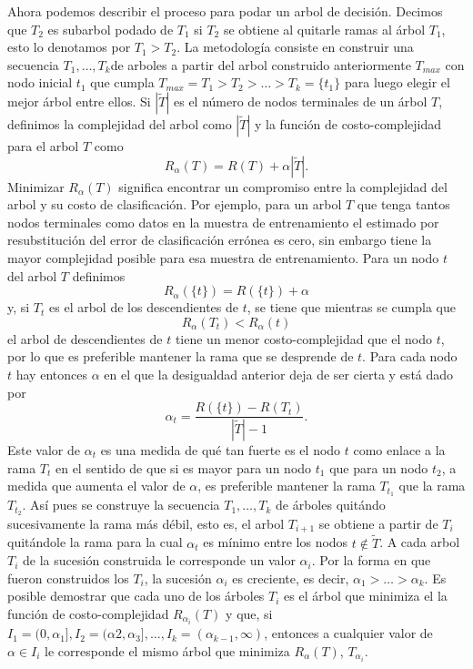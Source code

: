 \documentclass[letterpaper,12pt]{book}
\begin{document}
Ahora podemos describir el proceso para podar un arbol de decisión. Decimos que  $T_2$ es subarbol podado de $T_1$ si $T_2$ se obtiene al quitarle ramas al árbol $T_1$, esto lo denotamos por $T_1>T_2$. La metodología consiste en construir una secuencia $T_1,\dots,T_k$de arboles a partir del arbol construido anteriormente $T_{max}$ con nodo inicial $t_1$ que cumpla $T_{max} = T_1>T_2>\dots>T_{k}=\{t_1\}$ para luego elegir el mejor árbol entre ellos. Si $|\widetilde{T}|$ es el número de nodos terminales de un árbol $T$, definimos la complejidad del arbol como $|\widetilde{T}|$ y la función de costo-complejidad para el arbol $T$ como
\begin{equation}
R_{\alpha}(T) = R(T)+\alpha|\tilde{T}|.
\end{equation}
Minimizar $R_{\alpha}(T)$ significa encontrar un compromiso entre la complejidad del arbol y su costo de clasificación. Por ejemplo, para un arbol $T$ que tenga tantos nodos terminales como datos en la muestra de entrenamiento el estimado por resubstitución del error de clasificación errónea es cero, sin embargo tiene la mayor complejidad posible para esa muestra de entrenamiento. Para un nodo $t$ del arbol $T$ definimos
\begin{equation}
R_{\alpha}(\{t\}) = R(\{t\})+\alpha
\end{equation}
y, si $T_t$ es el arbol de los descendientes de $t$, se tiene que mientras se cumpla que
\begin{equation}
R_{\alpha}(T_{t}) < R_{\alpha}(t)
\end{equation}
el arbol de descendientes de $t$ tiene un menor costo-complejidad que el nodo $t$, por lo que es preferible mantener la rama que se desprende de $t$. Para cada nodo $t$ hay entonces $\alpha$ en el que la desigualdad anterior deja de ser cierta y está dado por
\begin{equation}
\alpha_t = \frac{R(\{t\})-R(T_t)}{|\tilde{T}|-1}. 
\end{equation} 
Este valor de $\alpha_t$ es una medida de qué tan fuerte es el nodo $t$ como enlace a la rama $T_t$ en el sentido de que si es mayor para un nodo $t_1$ que para un nodo $t_2$, a medida que aumenta el valor de $\alpha$, es preferible mantener la rama $T_{t_1}$ que la rama $T_{t_2}$. Así pues se construye la secuencia $T_1,\dots,T_k$ de árboles quitándo sucesivamente la rama más débil, esto es, el arbol $T_{i+1}$ se obtiene a partir de $T_{i}$ quitándole la rama para la cual $\alpha_t$ es mínimo entre los nodos $t\notin \widetilde{T}$. A cada arbol $T_i$ de la sucesión construida le corresponde un valor $\alpha_i$. Por la forma en que fueron construidos los $T_i$, la sucesión $\alpha_i$ es creciente, es decir, $\alpha_1>\dots>\alpha_k$. Es posible demostrar que cada uno de los árboles $T_i$ es el árbol que minimiza el la función de costo-complejidad  $R_{\alpha_i}(T)$ y que, si $I_1 = (0,\alpha_1],I_2 =(\alpha2,\alpha_3],\dots,I_k=(\alpha_{k-1},\infty)$, entonces a cualquier valor de $\alpha\in I_i$ le corresponde el mismo árbol que minimiza $R_\alpha(T)$, $T_{\alpha_i}$.
\end{document}

